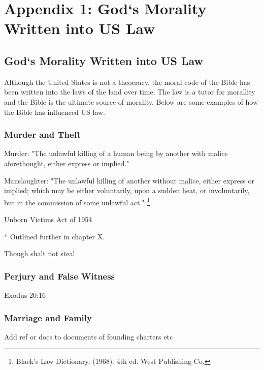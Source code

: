 \chapter{Appendix 1: God`s Morality Written into US Law}
\section{God`s Morality Written into US Law}

Although the United States is not a theocracy, the moral code of the Bible has been written into the laws of the land over time. The law is a tutor for morallity and the Bible is the ultimate source of morality.
Below are some examples of how the Bible has influenced US law.

\subsection{Murder and Theft}
Murder: "The unlawful killing of a human being by another with malice aforethought, either
express or implied."
\vspace{1\baselineskip}

\noindent Manslaughter: "The unlawful killing of another without malice, either express or implied; which may be either voluntarily, upon a sudden heat, or involuntarily, but in the commission of some unlawful act." \footnote{Black’s Law Dictionary. (1968). 4th ed. West Publishing Co.}

\vspace{2\baselineskip}


Unborn Victims Act of 1954


* Outlined further in chapter X. 



Though shalt not steal

\subsection{Perjury and False Witness}
Exodus 20:16



\subsection{Marriage and Family}

Add ref or docs to documents of founding charters etc 



